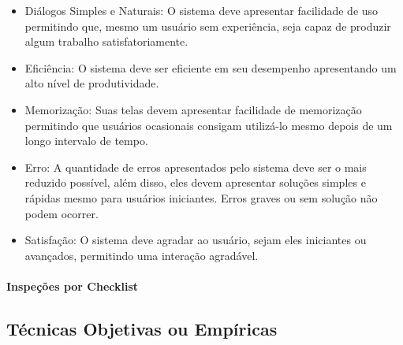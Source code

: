 \begin{itemize}
  \item Diálogos Simples e Naturais: O sistema deve apresentar facilidade de uso permitindo que, mesmo um usuário sem experiência, seja capaz de produzir algum trabalho satisfatoriamente.
  \item Eficiência: O sistema deve ser eficiente em seu desempenho apresentando um alto nível de produtividade.
  \item Memorização: Suas telas devem apresentar facilidade de memorização permitindo que usuários ocasionais consigam utilizá-lo mesmo depois de um longo intervalo de tempo.
  \item Erro: A quantidade de erros apresentados pelo sistema deve ser o mais reduzido possível, além disso, eles devem apresentar soluções simples e rápidas mesmo para usuários iniciantes. Erros graves ou sem solução não podem ocorrer.
  \item Satisfação: O sistema deve agradar ao usuário, sejam eles iniciantes ou avançados, permitindo uma interação agradável.
\end{itemize}



\paragraph{Inspeções por Checklist}

    




\subsection{Técnicas Objetivas ou Empíricas}












